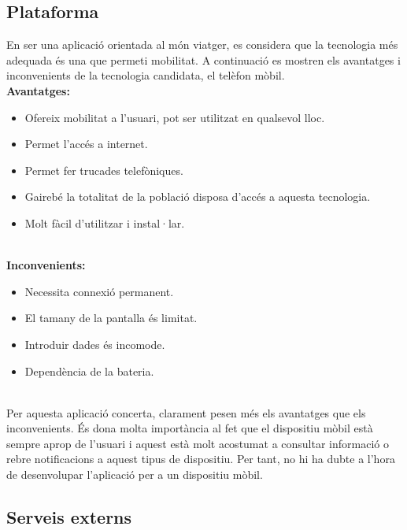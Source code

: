\subsection{Plataforma}
En ser una aplicació orientada al món viatger, es considera que la tecnologia més adequada és una que permeti mobilitat. A continuació es mostren els avantatges i inconvenients de la tecnologia candidata, el telèfon mòbil.\\
\textbf{Avantatges:}
\begin{itemize}
\item{}Ofereix mobilitat a l’usuari, pot ser utilitzat en qualsevol lloc.
\item{}Permet l’accés a internet.
\item{}Permet fer trucades telefòniques.
\item{}Gairebé la totalitat de la població disposa d’accés a aquesta tecnologia.
\item{}Molt fàcil d’utilitzar i instal·lar.
\end{itemize}
\\
\textbf{Inconvenients:}
\begin{itemize}
\item{}Necessita connexió permanent.
\item{}El tamany de la pantalla és limitat.
\item{}Introduir dades és incomode.
\item{}Dependència de la bateria.
\end{itemize}
\\
Per aquesta aplicació concerta, clarament pesen més els avantatges que els
inconvenients. És dona molta importància al fet que el dispositiu mòbil
està sempre aprop de l’usuari i aquest està molt acostumat a consultar
informació o rebre notificacions a aquest tipus de dispositiu. Per tant, no
hi ha dubte a l’hora de desenvolupar l’aplicació per a un dispositiu mòbil.

\subsection{Serveis externs}

